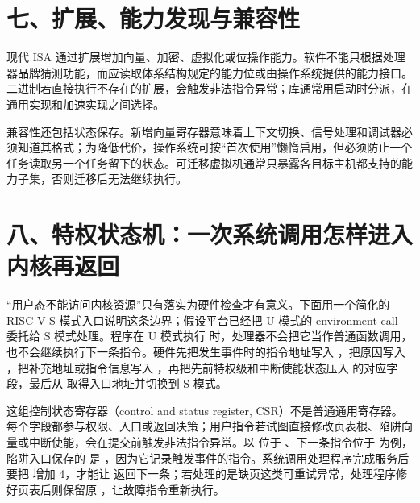 \section{七、扩展、能力发现与兼容性}

现代 ISA 通过扩展增加向量、加密、虚拟化或位操作能力。软件不能只根据处理器品牌猜测功能，而应读取体系结构规定的能力位或由操作系统提供的能力接口。二进制若直接执行不存在的扩展，会触发非法指令异常；库通常用启动时分派，在通用实现和加速实现之间选择。

兼容性还包括状态保存。新增向量寄存器意味着上下文切换、信号处理和调试器必须知道其格式；为降低代价，操作系统可按“首次使用”懒惰启用，但必须防止一个任务读取另一个任务留下的状态。可迁移虚拟机通常只暴露各目标主机都支持的能力子集，否则迁移后无法继续执行。




























\section{八、特权状态机：一次系统调用怎样进入内核再返回}

“用户态不能访问内核资源”只有落实为硬件检查才有意义。下面用一个简化的 RISC-V S 模式入口说明这条边界；假设平台已经把 U 模式的 environment call 委托给 S 模式处理。程序在 U 模式执行  时，处理器不会把它当作普通函数调用，也不会继续执行下一条指令。硬件先把发生事件时的指令地址写入 ，把原因写入 ，把补充地址或指令信息写入 ，再把先前特权级和中断使能状态压入  的对应字段，最后从  取得入口地址并切换到 S 模式。\cite{riscv-priv}

这组控制状态寄存器（control and status register, CSR）不是普通通用寄存器。每个字段都参与权限、入口或返回决策；用户指令若试图直接修改页表根、陷阱向量或中断使能，会在提交前触发非法指令异常。以  位于 、下一条指令位于  为例，陷阱入口保存的  是 ，因为它记录触发事件的指令。系统调用处理程序完成服务后要把  增加 4，才能让  返回下一条；若处理的是缺页这类可重试异常，处理程序修好页表后则保留原 ，让故障指令重新执行。


